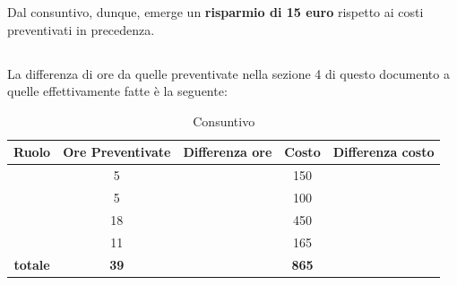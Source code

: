 Dal consuntivo, dunque, emerge un \textbf{risparmio di 15 euro} rispetto ai costi preventivati in precedenza.

\newpage

\subsection{\ARD}
La differenza di ore da quelle preventivate nella sezione 4 di questo documento a quelle effettivamente fatte è la seguente:

\begin{table}[h]
	\begin{center}
		\begin{tabular}{|c|c|c|c|c|}
			\hline
			\textbf{Ruolo}	& \textbf{Ore Preventivate} & \textbf{Differenza ore} & \textbf{Costo} & \textbf{Differenza costo}\\
			\hline
			\Pm &	5  & &	150 &	\\
			\hline
			\Am	&	5 &	& 100 & \\
			\hline
			\An	&	18 & & 450 & \\
			\hline
			\Ver &	11 & & 165 & \\
			\hline
			\textbf{totale}	&	\textbf{39} & & \textbf{865} & \\
			\hline
		\end{tabular}
	\end{center}
	\caption{Consuntivo \ARD}
\end{table}
